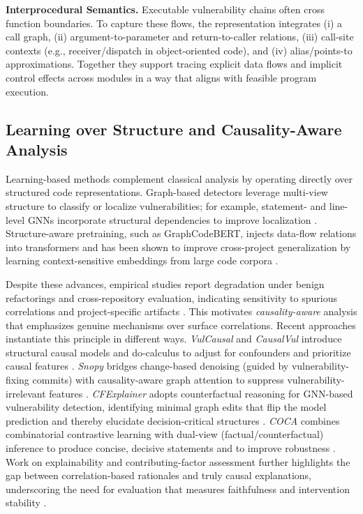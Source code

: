 \documentclass{buthesis}
\begin{document}
\textbf{Interprocedural Semantics.}
Executable vulnerability chains often cross function boundaries. To capture these flows, the representation integrates (i) a call graph, (ii) argument-to-parameter and return-to-caller relations, (iii) call-site contexts (e.g., receiver/dispatch in object-oriented code), and (iv) alias/points-to approximations. Together they support tracing explicit data flows and implicit control effects across modules in a way that aligns with feasible program execution.

\subsection{Learning over Structure and Causality-Aware Analysis}

Learning-based methods complement classical analysis by operating directly over structured code representations. Graph-based detectors leverage multi-view structure to classify or localize vulnerabilities; for example, statement- and line-level GNNs incorporate structural dependencies to improve localization \cite{hin2022linevd,Chakraborty2020}. Structure-aware pretraining, such as GraphCodeBERT, injects data-flow relations into transformers and has been shown to improve cross-project generalization by learning context-sensitive embeddings from large code corpora \cite{guo2021graphcodebert,fu2022linevul}. 

Despite these advances, empirical studies report degradation under benign refactorings and cross-repository evaluation, indicating sensitivity to spurious correlations and project-specific artifacts \cite{Li2022Empirical,yang2022natural}. This motivates \emph{causality-aware} analysis that emphasizes genuine mechanisms over surface correlations. Recent approaches instantiate this principle in different ways. \emph{VulCausal} and \emph{CausalVul} introduce structural causal models and do-calculus to adjust for confounders and prioritize causal features \cite{Kuang2024KSEM,Rahman2024ICSE}. \emph{Snopy} bridges change-based denoising (guided by vulnerability-fixing commits) with causality-aware graph attention to suppress vulnerability-irrelevant features \cite{Cao2024ASE}. \emph{CFExplainer} adopts counterfactual reasoning for GNN-based vulnerability detection, identifying minimal graph edits that flip the model prediction and thereby elucidate decision-critical structures \cite{Chu2024ISSTA}. \emph{COCA} combines combinatorial contrastive learning with dual-view (factual/counterfactual) inference to produce concise, decisive statements and to improve robustness \cite{Cao2024ICSE}. Work on explainability and contributing-factor assessment further highlights the gap between correlation-based rationales and truly causal explanations, underscoring the need for evaluation that measures faithfulness and intervention stability \cite{Allix2024,li2023xai,Moschitti2024}.
\end{document}
